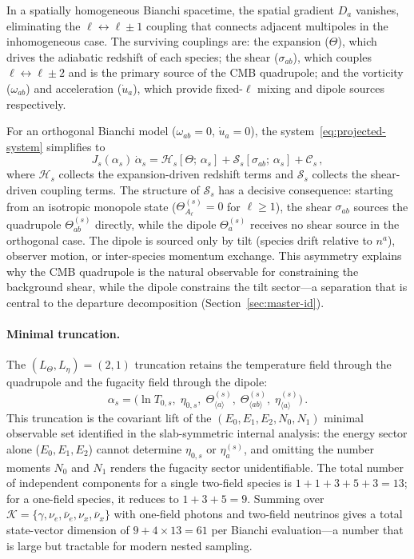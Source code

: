 In a spatially homogeneous Bianchi spacetime, the
spatial gradient $D_a$ vanishes, eliminating the
$\ell \leftrightarrow \ell \pm 1$ coupling that
connects adjacent multipoles in the inhomogeneous case.
The surviving couplings are:
the expansion ($\Theta$), which drives the adiabatic
redshift of each species;
the shear ($\sigma_{ab}$), which couples
$\ell \leftrightarrow \ell \pm 2$ and is the primary
source of the CMB quadrupole; and
the vorticity ($\omega_{ab}$) and acceleration
($\dot{u}_a$), which provide fixed-$\ell$ mixing and
dipole sources respectively.

For an orthogonal Bianchi model
($\omega_{ab} = 0$, $\dot{u}_a = 0$), the
system~\eqref{eq:projected-system} simplifies to
\begin{equation}\label{eq:Bianchi-orth}
J_s(\alpha_s)\, \dot{\alpha}_s
= \mathcal{H}_s[\Theta;\, \alpha_s]
+ \mathcal{S}_s[\sigma_{ab};\, \alpha_s]
+ \mathcal{C}_s\,,
\end{equation}
where $\mathcal{H}_s$ collects the expansion-driven
redshift terms and $\mathcal{S}_s$ collects the
shear-driven coupling terms.  The structure of
$\mathcal{S}_s$ has a decisive consequence: starting
from an isotropic monopole state
($\Theta^{(s)}_{A_\ell} = 0$ for $\ell \geq 1$), the
shear $\sigma_{ab}$ sources the quadrupole
$\Theta^{(s)}_{ab}$ directly, while the dipole
$\Theta^{(s)}_a$ receives no shear source in the
orthogonal case.  The dipole is sourced only by tilt
(species drift relative to $n^a$), observer motion, or
inter-species momentum exchange.  This asymmetry
explains why the CMB quadrupole is the natural
observable for constraining the background shear, while
the dipole constrains the tilt sector---a separation
that is central to the departure decomposition
(Section~\ref{sec:master-id}).


\paragraph{Minimal truncation.}

The $(L_\Theta, L_\eta) = (2, 1)$ truncation retains the
temperature field through the quadrupole and the fugacity
field through the dipole:
\begin{equation}\label{eq:minimal-state}
\alpha_s
= \big(
\ln T_{0,s},\;
\eta_{0,s},\;
\Theta^{(s)}_{\langle a \rangle},\;
\Theta^{(s)}_{\langle ab \rangle},\;
\eta^{(s)}_{\langle a \rangle}
\big)\,.
\end{equation}
This truncation is the covariant lift of the $(E_0, E_1, E_2, N_0,
N_1)$ minimal observable set identified in the
slab-symmetric internal analysis: the energy sector alone
($E_0, E_1, E_2$)
cannot determine $\eta_{0,s}$ or $\eta^{(s)}_a$, and
omitting the number moments $N_0$ and $N_1$ renders the
fugacity sector unidentifiable.  The total number of
independent components for a single two-field species is
$1 + 1 + 3 + 5 + 3 = 13$; for a one-field species, it
reduces to $1 + 3 + 5 = 9$.  Summing over
$\mathcal{K} = \{\gamma, \nu_e, \bar{\nu}_e, \nu_x,
\bar{\nu}_x\}$ with one-field photons and two-field
neutrinos gives a total state-vector dimension of
$9 + 4 \times 13 = 61$ per Bianchi evaluation---a
number that is large but tractable for modern nested
sampling.



